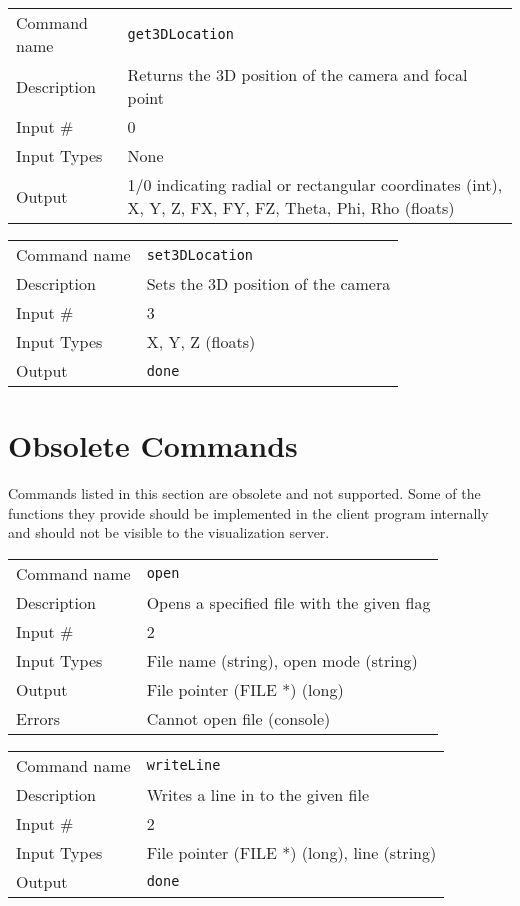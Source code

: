 \bigskip

\noindent
\begin{tabular}{l|p{5in}}
\hline
Command name & {\tt get3DLocation} \\
Description  & Returns the 3D position of the camera and focal point \\
Input \#     & 0 \\
Input Types  & None \\
Output       & 1/0 indicating radial or rectangular coordinates (int),
	       X, Y, Z, FX, FY, FZ, Theta, Phi, Rho (floats) \\
\hline
\end{tabular}

\bigskip

\noindent
\begin{tabular}{l|p{5in}}
\hline
Command name & {\tt set3DLocation} \\
Description  & Sets the 3D position of the camera \\
Input \#     & 3 \\
Input Types  & X, Y, Z (floats) \\
Output       & {\tt done} \\
\hline
\end{tabular}

\section{Obsolete Commands}

Commands listed in this section are obsolete and not supported. Some
of the functions they provide should be implemented in the client
program internally and should not be visible to the visualization
server.

\bigskip

\noindent
\begin{tabular}{l|p{5in}}
\hline
Command name & {\tt open} \\
Description  & Opens a specified file with the given flag \\
Input \#     & 2 \\
Input Types  & File name (string), open mode (string) \\
Output       & File pointer (FILE *) (long) \\
Errors       & Cannot open file (console) \\
\hline
\end{tabular}

\bigskip

\noindent
\begin{tabular}{l|p{5in}}
\hline
Command name & {\tt writeLine} \\
Description  & Writes a line in to the given file \\
Input \#     & 2 \\
Input Types  & File pointer (FILE *) (long), line (string) \\
Output       & {\tt done} \\
\hline
\end{tabular}


